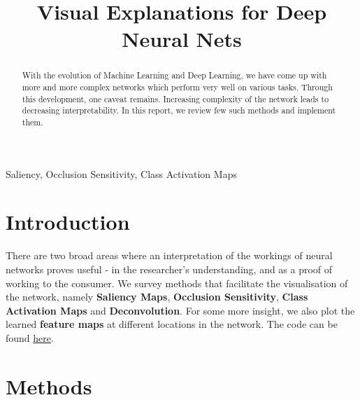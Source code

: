 \documentclass[conference]{IEEEtran}
\begin{document}
\title{Visual Explanations for Deep Neural Nets}

\author{
\and
{}
}

\maketitle

\begin{abstract}
With the evolution of Machine Learning and Deep Learning, we have come up with more and more complex networks which perform very well on various tasks. Through this development, one caveat remains. Increasing complexity of the network leads to decreasing interpretability. In this report, we review few such methods and implement them. 
\end{abstract}

\begin{IEEEkeywords}
Saliency, Occlusion Sensitivity, Class Activation Maps 
\end{IEEEkeywords}

\section{Introduction}
There are two broad areas where an interpretation of the workings of neural networks proves useful - in the researcher's understanding, and as a proof of working to the consumer. We survey methods that facilitate the visualisation of the network, namely \textbf{Saliency Maps}, \textbf{Occlusion Sensitivity}, \textbf{Class Activation Maps} and \textbf{Deconvolution}. For some more insight, we also plot the learned \textbf{feature maps} at different locations in the network. The code can be found \href{https://github.com/prateekgargX/Visualizing-Neural-Networks}{here}.
\section{Methods}



\end{document}
